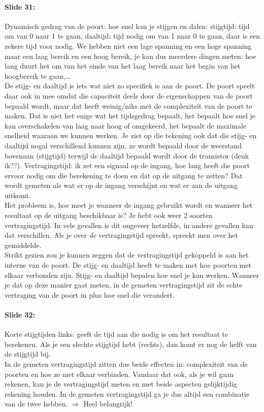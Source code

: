 \documentclass[10pt,a4paper]{book}
\begin{document}
\paragraph{Slide 31:} Dynamisch gedrag van de poort: hoe snel kan je stijgen en dalen: stijgtijd: tijd om van 0 naar 1 te gaan, daaltijd: tijd nodig om van 1 naar 0  te gaan, daar is een zekere tijd voor nodig. We hebben niet een lage spanning en een hoge spanning maar een laag bereik en een hoog bereik, je kan dus meerdere dingen meten: hoe lang duurt het om van het einde van het laag bereik naar het begin van het hoogbereik te gaan,\ldots \\
De stijg- en daaltijd is iets wat niet zo specifiek is aan de poort. De poort speelt daar ook in mee omdat die capaciteit deels door de eigenschappen van de poort bepaald wordt, maar dat heeft weinig/niks met de complexiteit van de poort te maken. Dat is niet het enige wat het tijdsgedrag bepaalt, het bepaalt hoe snel je kan overschakelen van laag naar hoog of omgekeerd, het bepaalt de maximale snelheid waaraan we kunnen werken. Je ziet op die tekening ook dat die stijg- en daaltijd nogal verschillend kunnen zijn, ze wordt bepaald door de weerstand bovenaan (stijgtijd) terwijl de daaltijd bepaald wordt door de transistor (denk ik??). %
Vertragingstijd: ik zet een signaal op de ingang, hoe lang heeft die poort ervoor nodig om die berekening te doen en dat op de uitgang te zetten? Dat wordt gemeten als wat er op de ingang verschijnt en wat er aan de uitgang uitkomt. \\
Het probleem is, hoe meet je wanneer de ingang gebruikt wordt en wanneer het resultaat op de uitgang beschikbaar is? Je hebt ook weer 2 soorten vertragingstijd. In vele gevallen is dit ongeveer hetzelfde, in andere gevallen kan dat verschillen. Als je over \emph{de} vertragingstijd spreekt, spreekt men over het gemiddelde.\\
Strikt gezien zou je kunnen zeggen dat de vertragingstijd gekoppeld is aan het interne van de poort. De stijg- en daaltijd heeft te maken met hoe poorten met elkaar verbonden zijn. Stijg- en daaltijd bepalen hoe snel je kan werken. Wanneer je dat op deze manier gaat meten, in de gemeten vertragingstijd zit de echte vertraging van de poort in plus hoe snel die verandert. 

\paragraph{Slide 32:} Korte stijgtijden links: geeft de tijd aan die nodig is om het resultaat te berekenen. Als je een slechte stijgtijd hebt (rechts), dan komt er nog de helft van de stijgtijd bij. \\
In de gemeten vertragingstijd zitten dus beide effecten in: complexiteit van de poorten en hoe ze met elkaar verbinden. Vandaar dat ook, als je wil gaan rekenen, kan je de vertragingstijd meten en met beide aspecten gelijktijdig rekening houden. In de gemeten vertragingstijd ga je dus altijd een combinatie van de twee hebben. $\Rightarrow$ Heel belangrijk!
\end{document}
